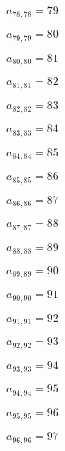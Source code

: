 \documentclass[a4paper,12pt]{article}
\begin{document}
$a _{ 78, 78 } = 79$

$a _{ 79, 79 } = 80$

$a _{ 80, 80 } = 81$

$a _{ 81, 81 } = 82$

$a _{ 82, 82 } = 83$

$a _{ 83, 83 } = 84$

$a _{ 84, 84 } = 85$

$a _{ 85, 85 } = 86$

$a _{ 86, 86 } = 87$

$a _{ 87, 87 } = 88$

$a _{ 88, 88 } = 89$

$a _{ 89, 89 } = 90$

$a _{ 90, 90 } = 91$

$a _{ 91, 91 } = 92$

$a _{ 92, 92 } = 93$

$a _{ 93, 93 } = 94$

$a _{ 94, 94 } = 95$

$a _{ 95, 95 } = 96$

$a _{ 96, 96 } = 97$
\end{document}
